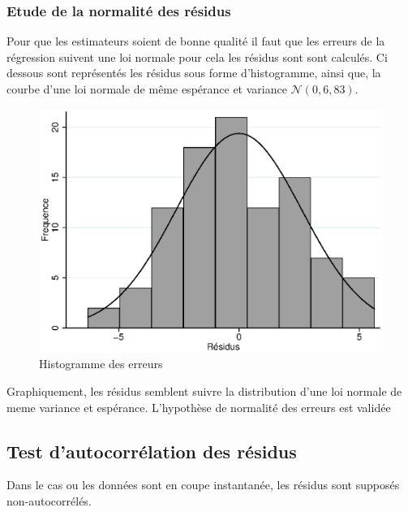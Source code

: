 \documentclass[12pt]{article}
\begin{document}
\subsubsection{Etude de la normalité des résidus}
Pour que les estimateurs soient de bonne qualité il faut que les erreurs de la régression suivent une loi normale pour cela les résidus sont sont calculés. Ci dessous sont représentés les résidus sous forme d'histogramme, ainsi que, la courbe d'une 
loi normale de même espérance et variance $\mathcal{N}(0,6,83)$.
\begin{figure}[H]
	\centering
	\includegraphics[scale=.6]{Graph.eps}
    \caption{Histogramme des erreurs}
	\label{fig:histogrammeErreur}
\end{figure}
Graphiquement, les résidus semblent suivre la distribution d'une loi normale de meme variance et espérance. L'hypothèse de normalité des erreurs est validée
\subsection{Test d'autocorrélation des résidus}
Dans le cas ou les données sont en coupe instantanée, les résidus sont supposés non-autocorrélés.
\end{document}
